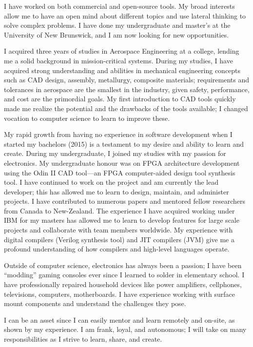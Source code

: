I have worked on both commercial and open-source tools.
My broad interests allow me to have an open mind about different topics and use lateral thinking to solve complex problems.
I have done my undergraduate and master's at the University of New Brunswick, and I am now looking for new opportunities.

I acquired three years of studies in Aerospace Engineering at a college, lending me a solid background in mission-critical systems.
During my studies, I have acquired strong understanding and abilities in mechanical engineering concepts such as CAD design, assembly, metallurgy, composite materials;
requirements and tolerances in aerospace are the smallest in the industry, given safety, performance, and cost are the primordial goals.
My first introduction to CAD tools quickly made me realize the potential and the drawbacks of the tools available; I changed vocation to computer science to learn to improve these.

My rapid growth from having no experience in software development when I started my bachelors (2015) is a testament to my desire and ability to learn and create.
During my undergraduate, I joined my studies with my passion for electronics. My undergraduate honour was on FPGA architecture development using the Odin II CAD tool---an FPGA computer-aided design tool synthesis tool.
I have continued to work on the project and am currently the lead developer; this has allowed me to learn to design, maintain, and administer projects.
I have contributed to numerous papers and mentored fellow researchers from Canada to New-Zealand.
The experience I have acquired working under IBM for my masters has allowed me to learn to develop features for large scale projects and collaborate with team members worldwide.
My experience with digital compilers (Verilog synthesis tool) and JIT compilers (JVM) give me a profound understanding of how compilers and high-level languages operate.

Outside of computer science, electronics has always been a passion; I have been ``modding'' gaming consoles ever since I learned to solder in elementary school.
I have professionally repaired household devices like power amplifiers, cellphones, televisions, computers, motherboards.
I have experience working with surface mount components and understand the challenges they pose.

I can be an asset since I can easily mentor and learn remotely and on-site, as shown by my experience.
I am frank, loyal, and autonomous; I will take on many responsibilities as I strive to learn, share, and create.
